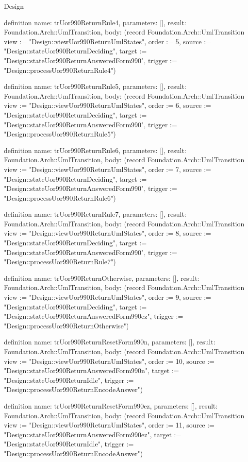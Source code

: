 \begin{lexlean}{Design}
\begin{semanticmodule}
definition{
  name: trUor990ReturnRule4,
  parameters: [],
  result: Foundation.Arch::UmlTransition,
  body: (record Foundation.Arch::UmlTransition {view := "Design::viewUor990ReturnUmlStates", order := 5, source := "Design::stateUor990ReturnDeciding", target := "Design::stateUor990ReturnAnsweredForm990", trigger := "Design::processUor990ReturnRule4"})
}

definition{
  name: trUor990ReturnRule5,
  parameters: [],
  result: Foundation.Arch::UmlTransition,
  body: (record Foundation.Arch::UmlTransition {view := "Design::viewUor990ReturnUmlStates", order := 6, source := "Design::stateUor990ReturnDeciding", target := "Design::stateUor990ReturnAnsweredForm990", trigger := "Design::processUor990ReturnRule5"})
}

definition{
  name: trUor990ReturnRule6,
  parameters: [],
  result: Foundation.Arch::UmlTransition,
  body: (record Foundation.Arch::UmlTransition {view := "Design::viewUor990ReturnUmlStates", order := 7, source := "Design::stateUor990ReturnDeciding", target := "Design::stateUor990ReturnAnsweredForm990", trigger := "Design::processUor990ReturnRule6"})
}

definition{
  name: trUor990ReturnRule7,
  parameters: [],
  result: Foundation.Arch::UmlTransition,
  body: (record Foundation.Arch::UmlTransition {view := "Design::viewUor990ReturnUmlStates", order := 8, source := "Design::stateUor990ReturnDeciding", target := "Design::stateUor990ReturnAnsweredForm990", trigger := "Design::processUor990ReturnRule7"})
}

definition{
  name: trUor990ReturnOtherwise,
  parameters: [],
  result: Foundation.Arch::UmlTransition,
  body: (record Foundation.Arch::UmlTransition {view := "Design::viewUor990ReturnUmlStates", order := 9, source := "Design::stateUor990ReturnDeciding", target := "Design::stateUor990ReturnAnsweredForm990ez", trigger := "Design::processUor990ReturnOtherwise"})
}

definition{
  name: trUor990ReturnResetForm990n,
  parameters: [],
  result: Foundation.Arch::UmlTransition,
  body: (record Foundation.Arch::UmlTransition {view := "Design::viewUor990ReturnUmlStates", order := 10, source := "Design::stateUor990ReturnAnsweredForm990n", target := "Design::stateUor990ReturnIdle", trigger := "Design::processUor990ReturnEncodeAnswer"})
}

definition{
  name: trUor990ReturnResetForm990ez,
  parameters: [],
  result: Foundation.Arch::UmlTransition,
  body: (record Foundation.Arch::UmlTransition {view := "Design::viewUor990ReturnUmlStates", order := 11, source := "Design::stateUor990ReturnAnsweredForm990ez", target := "Design::stateUor990ReturnIdle", trigger := "Design::processUor990ReturnEncodeAnswer"})
}


\end{semanticmodule}
\end{lexlean}
